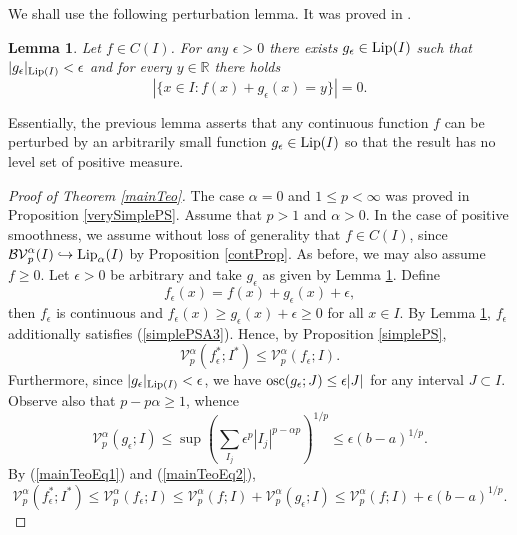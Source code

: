 \documentclass{amsart}
\newtheorem{lem}[theorem]{Lemma}
\DeclareMathOperator{\osc}{{\rm osc}}
\numberwithin{equation}{section}
\begin{document}
We shall use the following perturbation lemma. It was proved in \cite{BaLi26b}.
\begin{lem}
    \label{LipschitzApprox}
    Let $f\in C(I)$. For any $\epsilon>0$ there exists $g_\epsilon\in{\rm Lip}(I)$ such that $|g_\epsilon|_{{\rm Lip}(I)}<\epsilon$ and for every $y\in\mathbb{R}$ there holds
    \begin{equation}
        \nonumber
        |\{x\in I:f(x)+g_\epsilon(x)=y\}|=0.
    \end{equation}
\end{lem}
Essentially, the previous lemma asserts that any continuous function $f$ can be perturbed by an arbitrarily small function $g_\epsilon\in{\rm Lip}(I)$ so that the result has no level set of positive measure. 



\begin{proof}[Proof of Theorem \ref{mainTeo}]
The case $\alpha=0$ and $1\le p<\infty$ was proved in Proposition \ref{verySimplePS}. Assume that $p>1$ and $\alpha>0$. In the case of positive smoothness, we assume without loss of generality that $f\in C(I)$, since $\mathcal{BV}_p^\alpha(I)\hookrightarrow{\rm Lip}_\alpha(I)$ by Proposition \ref{contProp}. As before, we may also assume $f\ge0$.
Let $\epsilon>0$ be arbitrary and take $g_\epsilon$ as given by Lemma \ref{LipschitzApprox}. 
Define
\begin{equation}
    \nonumber
    f_\epsilon(x)=f(x)+g_\epsilon(x)+\epsilon,
\end{equation}
then $f_\epsilon$ is continuous and $f_\epsilon(x)\ge g_\epsilon(x)+\epsilon\ge0$ for all $x\in I$.
By Lemma \ref{LipschitzApprox}, $f_\epsilon$ additionally satisfies (\ref{simplePSA3}). Hence, by Proposition \ref{simplePS}, 
\begin{equation}
    \label{mainTeoEq1}
    \mathcal{V}_p^\alpha(f^*_\epsilon;I^*)\le\mathcal{V}_p^\alpha(f_\epsilon;I).
\end{equation}
Furthermore, since $|g_\epsilon|_{{\rm Lip}(I)}<\epsilon$, we have $\osc(g_\epsilon;J)\le \epsilon|J|$ for any interval $J\subset I$. Observe also that $p-p\alpha\ge1$, whence
\begin{equation}
    \label{mainTeoEq2}
    \mathcal{V}_p^\alpha(g_\epsilon;I)\le\sup\left(\sum_{I_j}\epsilon^p|I_j|^{p-\alpha p}\right)^{1/p}\le\epsilon(b-a)^{1/p}.
\end{equation}
By (\ref{mainTeoEq1}) and (\ref{mainTeoEq2}),
\begin{equation}
    \nonumber
    \mathcal{V}_p^\alpha(f_\epsilon^*;I^*)\le \mathcal{V}_p^\alpha(f_\epsilon;I)\le\mathcal{V}_p^\alpha(f;I)+\mathcal{V}_p^\alpha(g_\epsilon;I)\le\mathcal{V}_p^\alpha(f;I)+\epsilon(b-a)^{1/p}.

\end{equation}
\end{proof}
\end{document}
